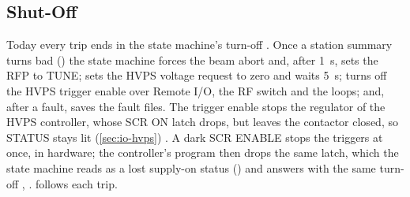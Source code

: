 \subsection{Shut-Off}

Today every trip ends in the state machine's turn-off . Once a station summary
turns bad () the state machine forces the beam abort and,
after \qty{1}{\second}, sets the RFP to TUNE; sets the HVPS voltage request to zero
and waits \qty{5}{\second}; turns off the HVPS trigger enable over Remote I/O, the RF
switch and the loops; and, after a fault, saves the fault files. The trigger enable
stops the regulator of the HVPS controller, whose SCR ON latch drops, but leaves the
contactor closed, so STATUS stays lit (\cref{sec:io-hvps}) . A dark SCR ENABLE
stops the triggers at once, in hardware; the controller's program then drops the same
latch, which the state machine reads as a lost supply-on status
() and answers with the same turn-off , .
 follows each trip.

